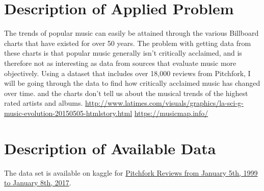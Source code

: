 \documentclass{article}
\begin{document}



\section{Description of Applied
Problem}\label{description-of-applied-problem}

The trends of popular music can easily be attained through the various
Billboard charts that have existed for over 50 years. The problem with
getting data from these charts is that popular music generally isn't
critically acclaimed, and is therefore not as interesting as data from
sources that evaluate music more objectively. Using a dataset that
includes over 18,000 reviews from Pitchfork, I will be going through the
data to find how critically acclaimed music has changed over time. and
the charts don't tell us about the musical trends of the highest rated
artists and albums.
\url{http://www.latimes.com/visuals/graphics/la-sci-g-music-evolution-20150505-htmlstory.html}
\url{https://musicmap.info/}

\section{Description of Available
Data}\label{description-of-available-data}

The data set is available on kaggle for
\href{https://www.kaggle.com/nolanbconaway/pitchfork-data}{Pitchfork
Reviews from January 5th, 1999 to January 8th, 2017}.



\end{document}
